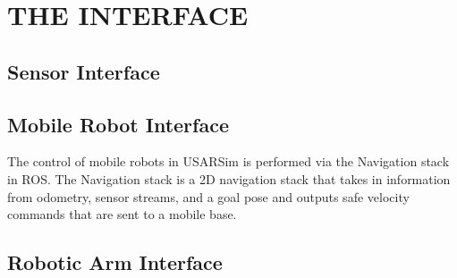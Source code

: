 \section*{THE INTERFACE}\label{s:interface}
\subsection*{Sensor Interface} 
\subsection*{Mobile Robot Interface}
The control of mobile robots in USARSim is performed via the Navigation stack in ROS. The Navigation stack is a 2D navigation stack that takes in information from odometry, sensor streams, and a goal pose and outputs safe velocity commands that are sent to a mobile base.

\subsection*{Robotic Arm Interface}

